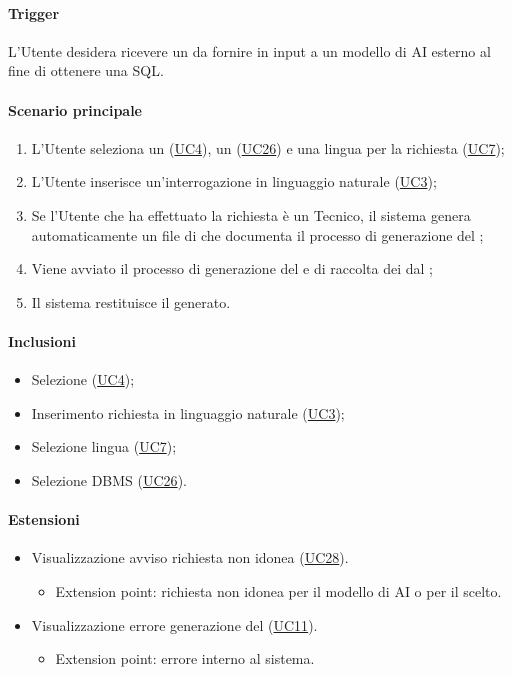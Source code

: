 \paragraph*{Trigger}
L'Utente desidera ricevere un  da fornire in input a un modello di AI esterno al fine di ottenere una  SQL.

\paragraph*{Scenario principale}
\begin{enumerate}
  \item L'Utente seleziona un (\hyperref[UC4]{UC4}), un  (\hyperref[UC26]{UC26}) e una lingua per la richiesta (\hyperref[UC7]{UC7});
  \item L'Utente inserisce un'interrogazione in linguaggio naturale (\hyperref[UC3]{UC3});
  \item Se l'Utente che ha effettuato la richiesta è un Tecnico, il sistema genera automaticamente un file di  che documenta il processo di generazione del ;
  \item Viene avviato il processo di generazione del  e di raccolta dei  dal ;
  \item Il sistema restituisce il  generato.
\end{enumerate}

\paragraph*{Inclusioni}
\begin{itemize}
  \item Selezione  (\hyperref[UC4]{UC4});
  \item Inserimento richiesta in linguaggio naturale (\hyperref[UC3]{UC3});
  \item Selezione lingua (\hyperref[UC7]{UC7});
  \item Selezione DBMS (\hyperref[UC26]{UC26}).
\end{itemize}

\paragraph*{Estensioni}
\begin{itemize}
  \item Visualizzazione avviso richiesta non idonea (\hyperref[UC28]{UC28}).
  \begin{itemize}
    \item Extension point: richiesta non idonea per il modello di AI o per il  scelto.
  \end{itemize}
  \item Visualizzazione errore generazione del  (\hyperref[UC11]{UC11}).
    \begin{itemize}
      \item Extension point: errore interno al sistema.
    \end{itemize}
\end{itemize}